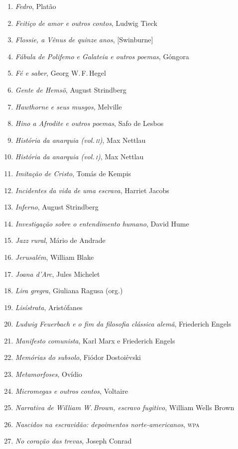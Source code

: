 \begin{enumerate}
\item \textit{Fedro}, Platão
\item \textit{Feitiço de amor e outros contos}, Ludwig Tieck
\item \textit{Flossie, a Vênus de quinze anos}, [Swinburne]
\item \textit{Fábula de Polifemo e Galateia e outros poemas}, Góngora
\item \textit{Fé e saber}, Georg W.\,F.\,Hegel
\item \textit{Gente de Hemsö}, August Strindberg 
\item \textit{Hawthorne e seus musgos}, Melville
\item \textit{Hino a Afrodite e outros poemas}, Safo de Lesbos 
\item \textit{História da anarquia (vol.\,\textsc{ii})}, Max Nettlau
\item \textit{História da anarquia (vol.\,\textsc{i})}, Max Nettlau
\item \textit{Imitação de Cristo}, Tomás de Kempis
\item \textit{Incidentes da vida de uma escrava}, Harriet Jacobs
\item \textit{Inferno}, August Strindberg
\item \textit{Investigação sobre o entendimento humano}, David Hume
\item \textit{Jazz rural}, Mário de Andrade
\item \textit{Jerusalém}, William Blake
\item \textit{Joana d'Arc}, Jules Michelet
\item \textit{Lira gregra}, Giuliana Ragusa (org.)
\item \textit{Lisístrata}, Aristófanes 
\item \textit{Ludwig Feuerbach e o fim da filosofia clássica alemã}, Friederich Engels
\item \textit{Manifesto comunista}, Karl Marx e Friederich Engels
\item \textit{Memórias do subsolo}, Fiódor Dostoiévski
\item \textit{Metamorfoses}, Ovídio
\item \textit{Micromegas e outros contos}, Voltaire
\item \textit{Narrativa de William W.\,Brown, escravo fugitivo}, William Wells Brown
\item \textit{Nascidos na escravidão: depoimentos norte-americanos}, \textsc{wpa}
\item \textit{No coração das trevas}, Joseph Conrad

\end{enumerate}
